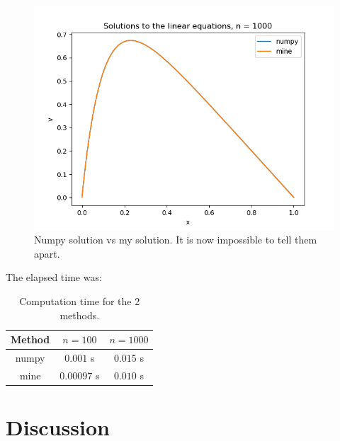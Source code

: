 \documentclass[a4paper,12pt,norsk]{article}
\begin{document}
	\begin{figure}[H]
		\includegraphics[scale = 0.7]{Figures/Figure_6.png}
		\centering
		\caption{Numpy solution vs my solution. It is now impossible to tell them apart.}
	\end{figure}
	The elapsed time was:
	\begin{table}[H]
		\begin{tabular}{|c|c|c|}
		\hline
		Method & $n = 100$ & $n = 1000$\\
		\hline
		numpy & $0.001$ s & $0.015$ s\\
		\hline
		mine & $0.00097$ s & $0.010$ s\\
		\hline
		\end{tabular}
	\centering
	\caption{Computation time for the 2 methods.}
	\end{table}
\section{Discussion}
\end{document}
